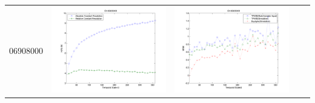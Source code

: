 \documentclass[11pt]{article}
\begin{document}
\begin{table}[H]
{\begin{tabular}{c  c   c   c  c }
06908000&\begin{minipage}{.4\textwidth}\includegraphics[width=\linewidth]{resultgraph/06908000e.png}\end{minipage}
&\begin{minipage}{.4\textwidth}\includegraphics[width=\linewidth]{resultgraph/06908000MI.png}\end{minipage}

\end{tabular}}
\end{table}
\end{document}
